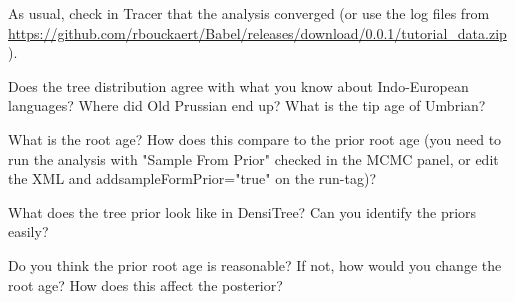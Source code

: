 \documentclass{article}
\begin{document}
As usual, check in Tracer that the analysis converged (or use the log files from \url{https://github.com/rbouckaert/Babel/releases/download/0.0.1/tutorial_data.zip}).

Does the tree distribution agree with what you know about Indo-European languages? Where did Old Prussian end up? What is the tip age of Umbrian?

What is the root age? How does this compare to the prior root age (you need to run the analysis with "Sample From Prior" checked in the MCMC panel, or edit the XML and addsampleFormPrior="true" on the run-tag)?

What does the tree prior look like in DensiTree? Can you identify the priors easily?

Do you think the prior root age is reasonable? If not, how would you change the root age? How does this affect the posterior?



\end{document}
